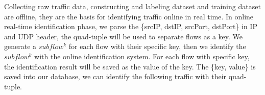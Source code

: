 \documentclass[conference]{IEEEtran}
\begin{document}
Collecting raw traffic data, constructing and labeling dataset and training dataset are offline, they are the basis for identifying traffic online in real time. In online real-time identification phase, we parse the \{srcIP, dstIP, srcPort, dstPort\} in IP and UDP header, the quad-tuple will be used to separate flows as a key. We generate a $subflow^k$ for each flow with their specific key, then we identify the $subflow^k$ with the online identification system. For each flow with specific key, the identification result will be saved as the value of the key. The \{key, value\} is saved into our database, we can identify the following traffic with their quad-tuple.


\end{document}
